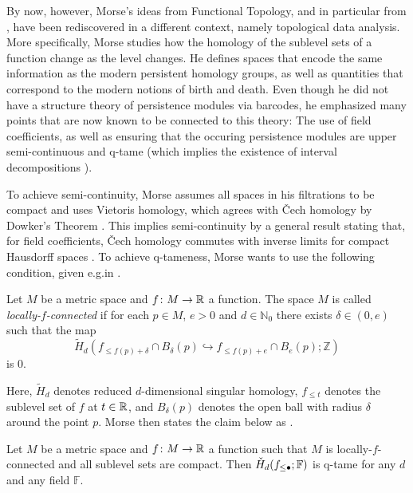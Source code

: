 By now, however, Morse's ideas from Functional Topology, and in particular from \cite{Morse.1940}, have been rediscovered in a different context, namely topological data analysis. More specifically, Morse studies how the homology of the sublevel sets of a function change as the level changes. He defines spaces that encode the same information as the modern persistent homology groups, as well as quantities that correspond to the modern notions of birth and death. Even though he did not have a structure theory of persistence modules via barcodes, he emphasized many points that are now known to be connected to this theory: The use of field coefficients, as well as ensuring that the occuring persistence modules are upper semi-continuous and q-tame (which implies the existence of interval decompositions \cite{schmahl2020structure}).

To achieve semi-continuity, Morse assumes all spaces in his filtrations to be compact and uses Vietoris homology, which agrees with \v{C}ech homology by Dowker's Theorem \cite{Dowker.1952}. This implies semi-continuity by a general result stating that, for field coefficients, \v{C}ech homology commutes with inverse limits for compact Hausdorff spaces \cite[Theorem VIII.3.6 and Theorem X.3.1]{MR0050886}. To achieve q-tameness, Morse wants to use the following condition, given e.g.\@ in \cite{Morse.1940}.

\begin{defi}
	Let $M$ be a metric space and $f \colon M \to \mathbb{R}$ a function. The space $M$ is called \emph{locally-$f$-connected} if for each $p\in M$, $e>0$ and $d\in\mathbb{N}_0$ there exists $\delta\in(0,e)$ such that the map 
	\[
	\tilde{H}_d(f_{\leq f(p)+\delta}\cap B_{\delta}(p)\hookrightarrow f_{\leq f(p)+e}\cap B_e(p);\mathbb{Z})
	\]
	is 0.
\end{defi}

Here, $\tilde{H}_{d}$ denotes reduced $d$-dimensional singular homology, $f_{\leq t}$ denotes the sublevel set of $f$ at $t\in\mathbb{R}$, and $B_{\delta}(p)$ denotes the open ball with radius $\delta$ around the point $p$. Morse then states the claim below as \cite[Theorem 6.3]{Morse.1940}.

\begin{claim}
	Let $M$ be a metric space and $f\colon M\to\mathbb{R}$ a function such that $M$ is locally-$f$-connected and all sublevel sets are compact. Then $\check{H}_d(f_{\leq\bullet};\mathbb{F})$ is q-tame for any $d$ and any field $\mathbb{F}$.
\end{claim}

